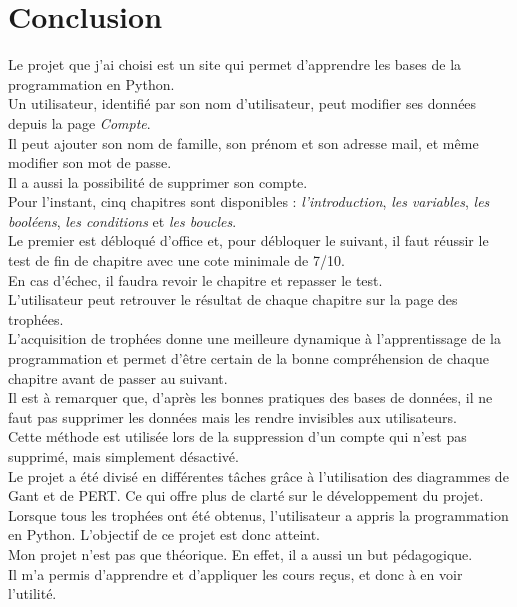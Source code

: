 \section{Conclusion}
\label{sec:conclusion}

Le projet que j'ai choisi est un site qui permet d’apprendre les bases de la programmation en Python. \\

Un utilisateur, identifié par son nom d’utilisateur, peut modifier ses données depuis la page \textit{Compte}. \\
Il peut ajouter son nom de famille, son prénom et son adresse mail, et même modifier son mot de passe. \\
Il a aussi la possibilité de supprimer son compte. \\

Pour l'instant, cinq chapitres sont disponibles : \textit{l'introduction}, \textit{les variables}, \textit{les booléens}, \textit{les conditions} et \textit{les boucles}. \\
Le premier est débloqué d'office et, pour débloquer le suivant, il faut réussir le test de fin de chapitre avec une cote minimale de 7/10. \\
En cas d'échec, il faudra revoir le chapitre et repasser le test. \\
L'utilisateur peut retrouver le résultat de chaque chapitre sur la page des trophées. \\

L'acquisition de trophées donne une meilleure dynamique à l'apprentissage de la programmation et permet d'être certain de la bonne compréhension de chaque chapitre avant de passer au suivant. \\

Il est à remarquer que, d’après les bonnes pratiques des bases de données, il ne faut pas supprimer les données mais les rendre invisibles aux utilisateurs. \\
Cette méthode est utilisée lors de la suppression d’un compte qui n’est pas supprimé, mais simplement désactivé. \\

Le projet a été divisé en différentes tâches grâce à l'utilisation des diagrammes de Gant et de PERT. Ce qui offre plus de clarté sur le développement du projet. \\

Lorsque tous les trophées ont été obtenus, l'utilisateur a appris la programmation en Python. L'objectif de ce projet est donc atteint.\\
Mon projet n'est pas que théorique. En effet, il a aussi un but pédagogique. \\
Il m'a permis d'apprendre et d'appliquer les cours reçus, et donc à en voir l'utilité.

